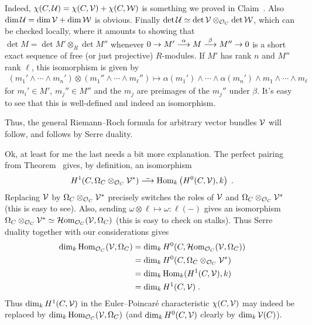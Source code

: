 \documentclass[a4paper,parskip=half,numbers=enddot, DIV=12]{scrreprt}
\begin{document}
Indeed, $\chi(C,\mathcal{U})=\chi(C,\mathcal{V})+\chi(C,\mathcal{W})$ is something we proved in Claim~. Also $\dim\mathcal{U}=\dim \mathcal{V}+\dim\mathcal{W}$ is obvious. Finally $\operatorname{det}\mathcal{U}\simeq \operatorname{det}\mathcal{V}\otimes_{\mathcal{O}_C}\operatorname{det}\mathcal{W}$, which can be checked locally, where it amounts to showing that $\det M=\det M'\otimes_R\det M''$ whenever $0\morphism M'\morphism[\alpha] M\morphism[\beta] M''\morphism 0$ is a short exact sequence of free (or just projective) $R$-modules. If $M'$ has rank $n$ and $M''$ rank $\ell$, this isomorphism is given by
\begin{align*}
	(m_1'\wedge\cdots \wedge m_n')\otimes (m_1''\wedge\cdots\wedge m_\ell'')\longmapsto \alpha(m_1')\wedge\cdots\wedge\alpha(m_n')\wedge m_1\wedge\cdots \wedge m_\ell
\end{align*}
for $m_i'\in M'$, $m_j''\in M''$ and the $m_j$ are preimages of the $m_j''$ under $\beta$. It's easy to see that this is well-defined and indeed an isomorphism.

Thus, the general Riemann--Roch formula  for arbitrary vector bundles $\mathcal{V}$ will follow, and  follows by Serre duality. 
\begin{rem}
	Ok, at least for me the last needs a bit more explanation. The perfect pairing from Theorem~ gives, by definition, an isomorphism
	\begin{align*}
	H^1(C,\Omega_C\otimes_{\Oo_C}\Vv^*)\isomorphism\Hom_k\left(H^0(C,\Vv),k\right)\;.
	\end{align*}
	Replacing $\mathcal{V}$ by $\Omega_C\otimes_{\mathcal{O}_C}\mathcal{V}^*$ precisely switches the roles of $\mathcal{V}$ and $\Omega_C\otimes_{\mathcal{O}_C}\mathcal{V}^*$ (this is easy to see). Also, sending $\omega\otimes\ell\mapsto \omega\colon \ell(-)$ gives an isomorphism $\Omega_C\otimes_{\mathcal{O}_C}\mathcal{V}^*\simeq\operatorname{\mathcal{H} om}_{\mathcal{O}_C}(\mathcal{V},\Omega_C)$ (this is easy to check on stalks). Thus Serre duality together with our considerations gives
	\begin{align*}
	\dim_k\operatorname{Hom}_{\mathcal{O}_C}(\mathcal{V},\Omega_C)&=\dim_kH^0(C,\operatorname{\mathcal{H} om}_{\mathcal{O}_C}(\mathcal{V},\Omega_C))\\
	&=\dim_kH^0(C,\Omega_C\otimes_{\mathcal{O}_C}\mathcal{V}^*)\\
	&=\dim_k\operatorname{Hom}_k(H^1(C,\mathcal{V}),k)\\
	&=\dim_kH^1(C,\mathcal{V})\;.
	\end{align*}
	Thus $\dim_kH^1(C,\mathcal{V})$ in the Euler--Poincaré characteristic $\chi(C,\mathcal{V})$ may indeed be replaced by $\dim_k\operatorname{Hom}_{\mathcal{O}_C}(\mathcal{V},\Omega_C)$ (and $\dim_kH^0(C,\mathcal{V})$ clearly by $\dim_k\mathcal{V}(C)$).
\end{rem}
\end{document}
